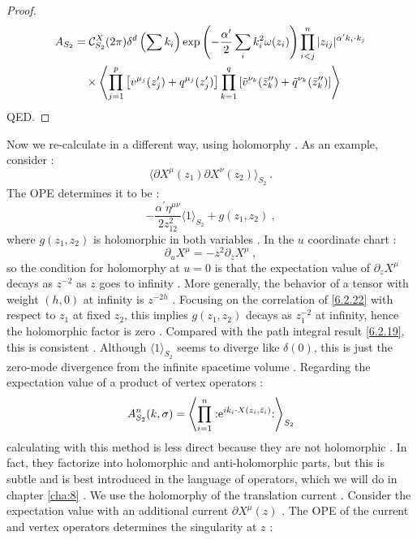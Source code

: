 \begin{tcolorbox}[breakable]
\begin{proof}
		\begin{align}
			A_{S_{2}} &= \mathcal{C}_{S_{2}}^{X}(2 \pi)  \delta^{d}\left(\sum k_{i}\right) 
			\exp\left(-\frac{\alpha'}{2}\sum_{i}k_{i}^{2}\omega(z_{i})\right)
			\prod_{i<j}^{n}|z_{i j}|^{\alpha^{\prime} k_{i} \cdot k_{j}} \nonumber \\
			&\quad \times \expval{ 
				\prod_{j=1}^{p} \left[ v^{\mu_{j}}(z_{j}^{\prime}) + q^{\mu_{j}}(z_{j}^{\prime}) \right] 
				\prod_{k=1}^{q} \left[ \tilde{v}^{\nu_{k}}(\bar{z}_{k}^{\prime \prime}) + \tilde{q}^{\nu_{k}}(\bar{z}_{k}^{\prime \prime}) \right] 
			}
		\end{align}
		QED.
	\end{proof}
\end{tcolorbox}
Now we re-calculate in a different way, using holomorphy . As an example, consider :
\begin{equation}
	\langle\partial X^{\mu}(z_{1}) \partial X^{\nu}(z_{2})\rangle_{S_{2}} \:. \label{6.2.21}
\end{equation}
The OPE determines it to be :
\begin{equation}
	-\frac{\alpha^{\prime} \eta^{\mu \nu}}{2 z_{12}^{2}}\langle 1\rangle_{S_{2}}+g(z_{1}, z_{2}) \:, \label{6.2.22}
\end{equation}
where $g(z_{1}, z_{2})$ is holomorphic in both variables . In the $u$ coordinate chart :
\begin{equation}
	\partial_{u} X^{\mu}=-z^{2} \partial_{z} X^{\mu} \:, \label{6.2.23}
\end{equation}
so the condition for holomorphy at $u=0$ is that the expectation value of $\partial_{z} X^{\mu}$ decays as $z^{-2}$ as $z$ goes to infinity . More generally, the behavior of a tensor with weight $(h, 0)$ at infinity is $z^{-2 h}$ . Focusing on the correlation of \eqref{6.2.22} with respect to $z_{1}$ at fixed $z_{2}$, this implies $g(z_{1}, z_{2})$ decays as $z_{1}^{-2}$ at infinity, hence the holomorphic factor is zero . Compared with the path integral result \eqref{6.2.19}, this is consistent . Although $\langle 1\rangle_{S_{2}}$ seems to diverge like $\delta(0)$, this is just the zero-mode divergence from the infinite spacetime volume . Regarding the expectation value of a product of vertex operators :
\begin{equation}
	A_{S_{2}}^{n}(k, \sigma)=\left\langle\prod_{i=1}^{n}:\mathrel{\mathrm{e}^{i k_{i} \cdot X(z_{i}, \bar{z}_{i})}}:\right\rangle \Big._{\!S_{2}}
	\label{6.2.24}
\end{equation}
calculating with this method is less direct because they are not holomorphic . In fact, they factorize into holomorphic and anti-holomorphic parts, but this is subtle and is best introduced in the language of operators, which we will do in chapter \ref{cha:8} . We use the holomorphy of the translation current . Consider the expectation value with an additional current $\partial X^{\mu}(z)$ . The OPE of the current and vertex operators determines the singularity at $z$ :
